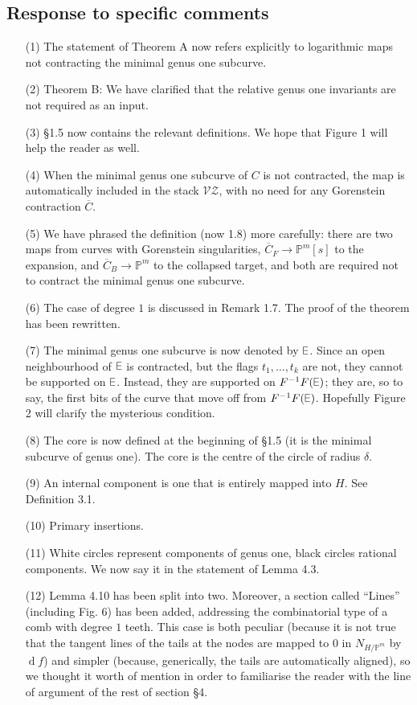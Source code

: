 \documentclass[11pt]{amsart}
\theoremstyle{plain}
\theoremstyle{remark}
\theoremstyle{definition}
\DeclareRobustCommand{\plE}{\text{\reflectbox{$\exists$}}}
\newcommand{\PP}{\mathbb{P}}
\begin{document}
\subsection*{Response to specific comments}
\begin{enumerate}
\item[(1)] The statement of Theorem A now refers explicitly to logarithmic maps not contracting the minimal genus one subcurve.
\item[(2)] Theorem B: We have clarified that the relative genus one invariants are not required as an input.
\item[(3)] \S 1.5 now contains the relevant definitions. We hope that Figure 1 will help the reader as well.
\item[(4)] When the minimal genus one subcurve of $C$ is not contracted, the map is automatically included in the stack $\mathcal{V\!Z}$, with no need for any Gorenstein contraction $\overline{C}$.
\item[(5)] We have phrased the definition (now 1.8) more carefully: there are two maps from curves with Gorenstein singularities, $\overline C_F\to\PP^m[s]$ to the expansion, and $\overline C_B\to\PP^m$ to the collapsed target, and both are required not to contract the minimal genus one subcurve.
\item[(6)] The case of degree $1$ is discussed in Remark 1.7. The proof of the theorem has been rewritten.
\item[(7)] The minimal genus one subcurve is now denoted by $\plE$. Since an open neighbourhood of $\plE$ is contracted, but the flags $t_1,\ldots,t_k$ are not, they cannot be supported on $\plE$. Instead, they are supported on $F^{-1}F(\plE)$; they are, so to say, the first bits of the curve that move off from $F^{-1}F(\plE)$. Hopefully Figure 2 will clarify the mysterious condition.
\item[(8)] The core is now defined at the beginning of \S 1.5 (it is the minimal subcurve of genus one). The core is the centre of the circle of radius $\delta$.
\item[(9)] An internal component is one that is entirely mapped into $H$. See Definition 3.1.
\item[(10)] Primary insertions.
\item[(11)] White circles represent components of genus one, black circles rational components. We now say it in the statement of Lemma 4.3.
\item[(12)] Lemma 4.10 has been split into two. Moreover, a section called ``Lines'' (including Fig. 6) has been added, addressing the combinatorial type of a comb with degree $1$ teeth. This case is both peculiar (because it is not true that the tangent lines of the tails at the nodes are mapped to $0$ in $N_{H/\PP^m}$ by $\operatorname{d}\!f$) and simpler (because, generically, the tails are automatically aligned), so we thought it worth of mention in order to familiarise the reader with the line of argument of the rest of section \S 4.

\end{enumerate}
\end{document}
